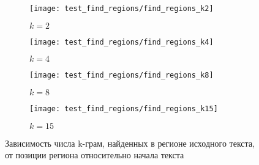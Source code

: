 \documentclass{main.tex}[subfiles]
\begin{document}
\newpage
{}

%

\begin{figure}[H]
    \centering
    \begin{subfigure}{.5\textwidth}
        \centering
        \texttt{[image: test\_find\_regions/find\_regions\_k2]}
        \caption{$ k = 2 $}
    \end{subfigure}%
    \begin{subfigure}{.5\textwidth}
        \centering
        \texttt{[image: test\_find\_regions/find\_regions\_k4]}
        \caption{$ k = 4 $}
    \end{subfigure}

    \begin{subfigure}{.5\textwidth}
        \centering
        \texttt{[image: test\_find\_regions/find\_regions\_k8]}
        \caption{$ k = 8 $}
    \end{subfigure}%
    \begin{subfigure}{.5\textwidth}
        \centering
        \texttt{[image: test\_find\_regions/find\_regions\_k15]}
        \caption{$ k = 15 $}
    \end{subfigure}
    \caption{Зависимость числа k-грам, найденных в регионе исходного текста, от позиции региона относительно начала текста}
    \label{fig:find_k}
\end{figure}
\end{document}
